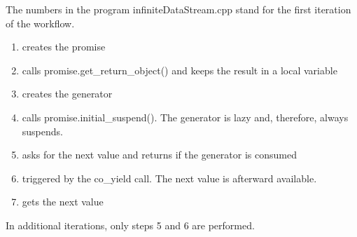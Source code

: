 
The numbers in the program infiniteDataStream.cpp stand for the first iteration of the workflow.

\begin{enumerate}
\item 
creates the promise

\item 
calls promise.get\_return\_object() and keeps the result in a local variable
 
\item 
creates the generator

\item 
calls promise.initial\_suspend(). The generator is lazy and, therefore, always suspends.

\item 
asks for the next value and returns if the generator is consumed

\item 
triggered by the co\_yield call. The next value is afterward available.

\item 
gets the next value
\end{enumerate}

In additional iterations, only steps 5 and 6 are performed.


